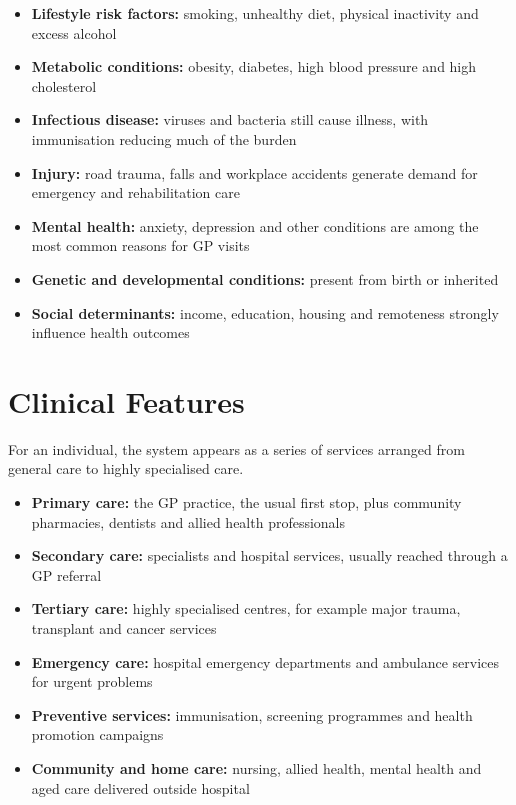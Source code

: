 \begin{itemize}
    \item \textbf{Lifestyle risk factors:} smoking, unhealthy diet, physical inactivity and excess alcohol
    \item \textbf{Metabolic conditions:} obesity, diabetes, high blood pressure and high cholesterol
    \item \textbf{Infectious disease:} viruses and bacteria still cause illness, with immunisation reducing much of the burden
    \item \textbf{Injury:} road trauma, falls and workplace accidents generate demand for emergency and rehabilitation care
    \item \textbf{Mental health:} anxiety, depression and other conditions are among the most common reasons for GP visits
    \item \textbf{Genetic and developmental conditions:} present from birth or inherited
    \item \textbf{Social determinants:} income, education, housing and remoteness strongly influence health outcomes
\end{itemize}

\section*{Clinical Features}
For an individual, the system appears as a series of services arranged from general care to highly specialised care.

\begin{itemize}
    \item \textbf{Primary care:} the GP practice, the usual first stop, plus community pharmacies, dentists and allied health professionals
    \item \textbf{Secondary care:} specialists and hospital services, usually reached through a GP referral
    \item \textbf{Tertiary care:} highly specialised centres, for example major trauma, transplant and cancer services
    \item \textbf{Emergency care:} hospital emergency departments and ambulance services for urgent problems
    \item \textbf{Preventive services:} immunisation, screening programmes and health promotion campaigns
    \item \textbf{Community and home care:} nursing, allied health, mental health and aged care delivered outside hospital
\end{itemize}

